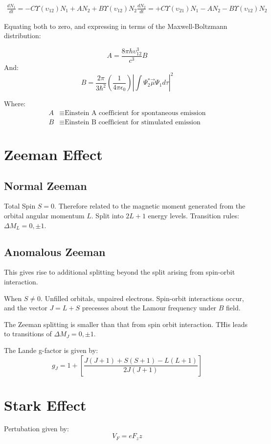 \documentclass[12pt]{article}
\begin{document}
\begin{align*}
    \frac{dN_1}{dt} = -C\Upsilon(\upsilon_{12})N_1 + AN_2 + B\Upsilon(\upsilon_{12})N_2
    \frac{dN_2}{dt} = +C\Upsilon(\upsilon_{21})N_1 - AN_2 - B\Upsilon(\upsilon_{12})N_2
\end{align*}

Equating both to zero, and expressing in terms of the Maxwell-Boltzmann distribution:

\[A = \frac{8\pi h \upsilon^3_{12}}{c^3}B\]
And:
\[B = \frac{2\pi}{3\hbar^2}\left(\frac{1}{4\pi\epsilon_0}\right)\left|\int\Psi^*_2\vec{\mu}\Psi_1d\tau\right|^2\]

Where:
\begin{align*}
    A &\equiv \text{Einstein A coefficient for spontaneous emission}\\
    B &\equiv \text{Einstein B coefficient for stimulated emission}
\end{align*}

\section{Zeeman Effect}

\subsection{Normal Zeeman}
Total Spin $S = 0$. Therefore related to the magnetic moment generated from the orbital angular momentum $L$. Split into $2L+1$ energy levels. Transition rules: $\Delta M_L = 0, \pm 1$.

\subsection{Anomalous Zeeman}
This gives rise to additional splitting beyond the split arising from spin-orbit interaction.

When $S\neq 0$. Unfilled orbitals, unpaired electrons. Spin-orbit interactions occur, and the vector $J=L+S$ precesses about the Lamour frequency under $B$ field.

The Zeeman splitting is smaller than that from spin orbit interaction. THis leads to transitions of $\Delta M_J = 0, \pm 1$.

The Lande g-factor is given by:
\[ g_J = 1 + \left[\frac{J(J+1)+S(S+1)-L(L+1)}{2J(J+1)}\right]\]


\section{Stark Effect}
Pertubation given by:
\[ V_F = eF_zz\]
\end{document}

